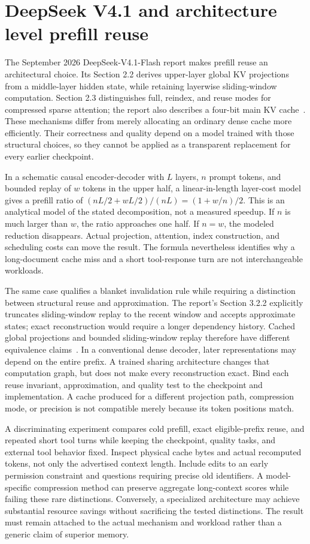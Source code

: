 \section{DeepSeek V4.1 and architecture level prefill reuse}
\label{sec:C03:frontier}
The September 2026 DeepSeek-V4.1-Flash report makes prefill reuse an architectural choice. Its Section 2.2 derives upper-layer global KV projections from a middle-layer hidden state, while retaining layerwise sliding-window computation. Section 2.3 distinguishes full, reindex, and reuse modes for compressed sparse attention; the report also describes a four-bit main KV cache~\cite{rewrite_deepseek41}. These mechanisms differ from merely allocating an ordinary dense cache more efficiently. Their correctness and quality depend on a model trained with those structural choices, so they cannot be applied as a transparent replacement for every earlier checkpoint.

In a schematic causal encoder-decoder with $L$ layers, $n$ prompt tokens, and bounded replay of $w$ tokens in the upper half, a linear-in-length layer-cost model gives a prefill ratio of $(nL/2+wL/2)/(nL)=(1+w/n)/2$. This is an analytical model of the stated decomposition, not a measured speedup. If $n$ is much larger than $w$, the ratio approaches one half. If $n=w$, the modeled reduction disappears. Actual projection, attention, index construction, and scheduling costs can move the result. The formula nevertheless identifies why a long-document cache miss and a short tool-response turn are not interchangeable workloads.

The same case qualifies a blanket invalidation rule while requiring a distinction between structural reuse and approximation. The report's Section 3.2.2 explicitly truncates sliding-window replay to the recent window and accepts approximate states; exact reconstruction would require a longer dependency history. Cached global projections and bounded sliding-window replay therefore have different equivalence claims~\cite{rewrite_deepseek41}. In a conventional dense decoder, later representations may depend on the entire prefix. A trained sharing architecture changes that computation graph, but does not make every reconstruction exact. Bind each reuse invariant, approximation, and quality test to the checkpoint and implementation. A cache produced for a different projection path, compression mode, or precision is not compatible merely because its token positions match.

A discriminating experiment compares cold prefill, exact eligible-prefix reuse, and repeated short tool turns while keeping the checkpoint, quality tasks, and external tool behavior fixed. Inspect physical cache bytes and actual recomputed tokens, not only the advertised context length. Include edits to an early permission constraint and questions requiring precise old identifiers. A model-specific compression method can preserve aggregate long-context scores while failing these rare distinctions. Conversely, a specialized architecture may achieve substantial resource savings without sacrificing the tested distinctions. The result must remain attached to the actual mechanism and workload rather than a generic claim of superior memory.




